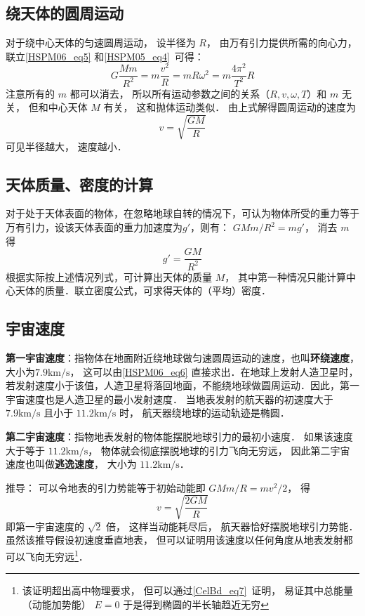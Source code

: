 \subsection{绕天体的圆周运动}

对于绕中心天体的匀速圆周运动， 设半径为 $R$， 由万有引力提供所需的向心力， 联立\autoref{HSPM06_eq5} 和\autoref{HSPM05_eq4}~可得：
\begin{equation}\label{HSPM06_eq8}
G\frac{Mm}{R^2}=m\frac{v^2}{R}=mR\omega^2=m\frac{4\pi^2}{T^2}R
\end{equation}
注意所有的 $m$ 都可以消去， 所以所有运动参数之间的关系（$R,v,\omega,T$）和 $m$ 无关， 但和中心天体 $M$ 有关， 这和抛体运动类似． 由上式解得圆周运动的速度为
\begin{equation}\label{HSPM06_eq6}
v = \sqrt{\frac{GM}{R}}
\end{equation}
可见半径越大， 速度越小．

\subsection{天体质量、密度的计算}

对于处于天体表面的物体，在忽略地球自转的情况下，可认为物体所受的重力等于万有引力，设该天体表面的重力加速度为$g'$，则有： $GMm/R^2=mg'$， 消去 $m$ 得
\begin{equation}
g' = \frac{GM}{R^2}
\end{equation}
根据实际按上述情况列式，可计算出天体的质量 $M$， 其中第一种情况只能计算中心天体的质量．联立密度公式，可求得天体的（平均）密度．

\subsection{宇宙速度}

\textbf{第一宇宙速度}：指物体在地面附近绕地球做匀速圆周运动的速度，也叫\textbf{环绕速度}，大小为$7.9\mathrm{km/s}$， 这可以由\autoref{HSPM06_eq6} 直接求出．在地球上发射人造卫星时，若发射速度小于该值，人造卫星将落回地面，不能绕地球做圆周运动．因此，第一宇宙速度也是人造卫星的最小发射速度． 当地表发射的航天器的初速度大于 $7.9\mathrm{km/s}$ 且小于 $11.2\mathrm{km/s}$ 时， 航天器绕地球的运动轨迹是椭圆．

\textbf{第二宇宙速度}：指物地表发射的物体能摆脱地球引力的最初小速度． 如果该速度大于等于 $11.2\mathrm{km/s}$， 物体就会彻底摆脱地球的引力飞向无穷远， 因此第二宇宙速度也叫做\textbf{逃逸速度}， 大小为 $11.2\mathrm{km/s}$．

推导： 可以令地表的引力势能等于初始动能即 $GMm/R = mv^2/2$， 得
\begin{equation}\label{HSPM06_eq7}
v = \sqrt{\frac{2GM}{R}}
\end{equation}
即第一宇宙速度的 $\sqrt{2}$ 倍， 这样当动能耗尽后， 航天器恰好摆脱地球引力势能． 虽然该推导假设初速度垂直地表， 但可以证明用该速度以任何角度从地表发射都可以飞向无穷远\footnote{该证明超出高中物理要求， 但可以通过\autoref{CelBd_eq7}~证明， 易证其中总能量（动能加势能） $E = 0$ 于是得到椭圆的半长轴趋近无穷}．

